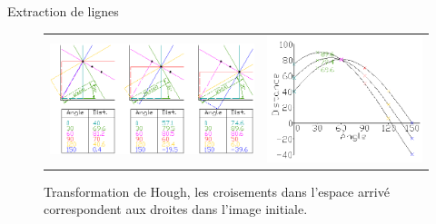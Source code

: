 \begin{frame}{Extraction de lignes}
\begin{figure}[ht!]
\centering
\begin{tabular}{cc}
\includegraphics[width = .5\columnwidth]{fig/Hough_transform_diagram.png} &
\includegraphics[width = .5\columnwidth]{fig/Hough_space_plot_example.png}
\end{tabular}
\caption{Transformation de Hough, les croisements dans l'espace arrivé correspondent aux droites dans l'image initiale. }
\end{figure}
\end{frame}
